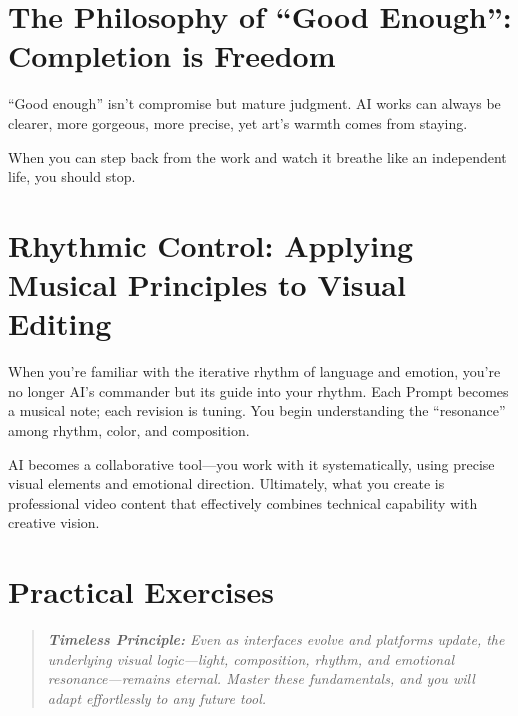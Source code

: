 \section{The Philosophy of ``Good Enough'': Completion is Freedom}
\label{sec:good-enough}

``Good enough'' isn't compromise but mature judgment. AI works can always be clearer, more gorgeous, more precise, yet art's warmth comes from staying.

When you can step back from the work and watch it breathe like an independent life, you should stop.

\section{Rhythmic Control: Applying Musical Principles to Visual Editing}
\label{sec:director-to-composer}

When you're familiar with the iterative rhythm of language and emotion, you're no longer AI's commander but its guide into your rhythm. Each Prompt becomes a musical note; each revision is tuning. You begin understanding the ``resonance'' among rhythm, color, and composition.

AI becomes a collaborative tool—you work with it systematically, using precise visual elements and emotional direction. Ultimately, what you create is professional video content that effectively combines technical capability with creative vision.

\section*{Practical Exercises}

\begin{quote}
\textit{\textbf{Timeless Principle:} Even as interfaces evolve and platforms update, the underlying visual logic---light, composition, rhythm, and emotional resonance---remains eternal. Master these fundamentals, and you will adapt effortlessly to any future tool.}
\end{quote}

